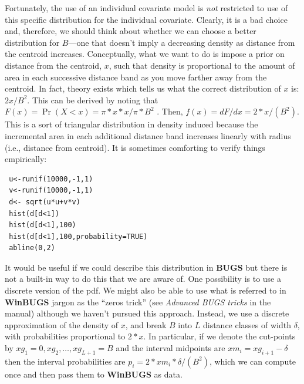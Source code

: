 Fortunately, the use of an individual covariate model is {\it not} restricted to
use of this specific distribution for the individual
covariate. Clearly, it is a bad choice and, therefore, we should think
about whether we can choose a better distribution for $B$---one that
doesn't imply a decreasing density as distance from the centroid
increases.  Conceptually, what we want to do is impose a prior on
distance from the centroid, $x$, such that density is proportional to
the amount of area in each successive distance band as you move
farther away from the centroid.  In fact, theory exists
which tells us what the correct distribution of $x$ is:
$2x/B^2$. This can be derived by noting that $F(x) = \Pr(X<x) =
\pi*x*x/\pi*B^{2}$ . Then, $f(x) = dF/dx =
2*x/(B^{2})$. This is a sort of triangular distribution in
density
induced because the incremental area in each additional distance band
increases linearly with radius (i.e., distance from centroid). It is
sometimes comforting to verify things empirically:
{\small
\begin{verbatim}
 u<-runif(10000,-1,1)
 v<-runif(10000,-1,1)
 d<- sqrt(u*u+v*v)
 hist(d[d<1])
 hist(d[d<1],100)
 hist(d[d<1],100,probability=TRUE)
 abline(0,2)
\end{verbatim}
}

It would be useful if we could describe this distribution in {\bf
  BUGS} but there is not a built-in way to do this that we are aware
of.  One possibility is to use a discrete version of the pdf. We might
also be able to use what is referred to in {\bf WinBUGS} jargon as the
``zeros trick'' (see {\it Advanced BUGS tricks} in the manual)
although we haven't pursued this approach. Instead, we use a discrete
approximation of the density of $x$, and break $B$ into $L$
distance classes of width $\delta$, with probabilities proportional to
$2*x$. In particular, if we denote the cut-points by $xg_{1}=0,xg_{2},
\ldots, xg_{L+1}=B$ and the interval midpoints are $xm_{i} =
xg_{i+1}-\delta$ 
then the interval probabilities are $p_{i} =
2*xm_{i}*\delta/(B^{2})$, which we can compute once and then
pass them to {\bf WinBUGS} as data.

